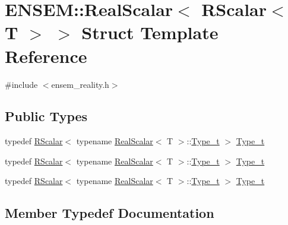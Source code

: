\hypertarget{structENSEM_1_1RealScalar_3_01RScalar_3_01T_01_4_01_4}{}\section{E\+N\+S\+EM\+:\+:Real\+Scalar$<$ R\+Scalar$<$ T $>$ $>$ Struct Template Reference}
\label{structENSEM_1_1RealScalar_3_01RScalar_3_01T_01_4_01_4}


{\ttfamily \#include $<$ensem\+\_\+reality.\+h$>$}

\subsection*{Public Types}
\begin{DoxyCompactItemize}
\item 
typedef \mbox{\hyperlink{classENSEM_1_1RScalar}{R\+Scalar}}$<$ typename \mbox{\hyperlink{structENSEM_1_1RealScalar}{Real\+Scalar}}$<$ T $>$\+::\mbox{\hyperlink{structENSEM_1_1RealScalar_3_01RScalar_3_01T_01_4_01_4_a98fef60a69ef8b4856721a6f7b115ce5}{Type\+\_\+t}} $>$ \mbox{\hyperlink{structENSEM_1_1RealScalar_3_01RScalar_3_01T_01_4_01_4_a98fef60a69ef8b4856721a6f7b115ce5}{Type\+\_\+t}}
\item 
typedef \mbox{\hyperlink{classENSEM_1_1RScalar}{R\+Scalar}}$<$ typename \mbox{\hyperlink{structENSEM_1_1RealScalar}{Real\+Scalar}}$<$ T $>$\+::\mbox{\hyperlink{structENSEM_1_1RealScalar_3_01RScalar_3_01T_01_4_01_4_a98fef60a69ef8b4856721a6f7b115ce5}{Type\+\_\+t}} $>$ \mbox{\hyperlink{structENSEM_1_1RealScalar_3_01RScalar_3_01T_01_4_01_4_a98fef60a69ef8b4856721a6f7b115ce5}{Type\+\_\+t}}
\item 
typedef \mbox{\hyperlink{classENSEM_1_1RScalar}{R\+Scalar}}$<$ typename \mbox{\hyperlink{structENSEM_1_1RealScalar}{Real\+Scalar}}$<$ T $>$\+::\mbox{\hyperlink{structENSEM_1_1RealScalar_3_01RScalar_3_01T_01_4_01_4_a98fef60a69ef8b4856721a6f7b115ce5}{Type\+\_\+t}} $>$ \mbox{\hyperlink{structENSEM_1_1RealScalar_3_01RScalar_3_01T_01_4_01_4_a98fef60a69ef8b4856721a6f7b115ce5}{Type\+\_\+t}}
\end{DoxyCompactItemize}


\subsection{Member Typedef Documentation}
\mbox{\label{structENSEM_1_1RealScalar_3_01RScalar_3_01T_01_4_01_4_a98fef60a69ef8b4856721a6f7b115ce5}} 
